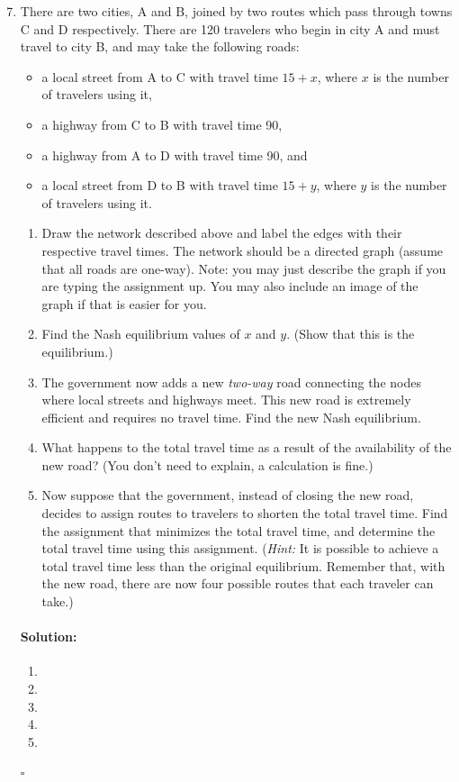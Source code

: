 \documentclass[11pt,letterpaper]{article}
\newif \iftemplate \templatetrue
\newenvironment{solution}{\paragraph{Solution:}}{\hfill$\square$}
\theoremstyle{definition}
\begin{document}
\begin{enumerate}
\setcounter{enumi}{6}
\item There are two cities, A and B, joined by two routes which pass through towns C and D respectively. There are 120 travelers who begin in city A and must travel to city B, and may take the following roads:
\begin{itemize}
\item a local street from A to C with travel time $15 + x$, where $x$ is the number of travelers using it,
\item a highway from C to B with travel time 90,
\item a highway from A to D with travel time 90, and
\item a local street from D to B with travel time $15 + y$, where $y$ is the number of travelers using it.
\end{itemize}
\begin{enumerate}
\item Draw the network described above and label the edges with their respective travel times. The network should be a directed graph (assume that all roads are one-way). Note: you may just describe the graph if you are typing the assignment up. You may also include an image of the graph if that is easier for you.
\item Find the Nash equilibrium values of $x$ and $y$. (Show that this is the equilibrium.)
\item The government now adds a new \emph{two-way} road connecting the nodes where local streets and highways meet. This new road is extremely efficient and requires no travel time. Find the new Nash equilibrium.
\item What happens to the total travel time as a result of the availability of the new road? (You don't need to explain, a calculation is fine.)
\item Now suppose that the government, instead of closing the new road, decides to assign routes to travelers to shorten the total travel time. Find the assignment that minimizes the total travel time, and determine the total travel time using this assignment. (\emph{Hint:} It is possible to achieve a total travel time less than the original equilibrium. Remember that, with the new road, there are now four possible routes that each traveler can take.)
\end{enumerate}
\iftemplate
\begin{solution}
\begin{enumerate}[label=(\alph*)]
\item 
\item 
\item
\item
\item
\end{enumerate}
\end{solution}
\newpage
\fi
\end{enumerate}
\end{document}
